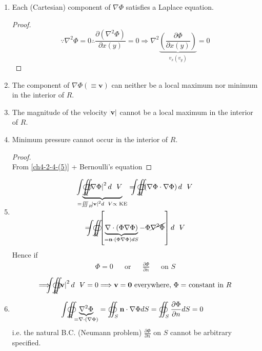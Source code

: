 \begin{enumerate}[label = (\arabic*)]
\begin{proof}
\[\]
\end{proof}
\item Each (Cartesian) component of $\nabla\Phi$ satisfies a Laplace equation.
\begin{proof}
\[
\because\nabla^2\Phi = 0\therefore\frac{\partial\left(\nabla^2\Phi\right)}{\partial x (y)} = 0\Longrightarrow\nabla^2\underbrace{\left(\frac{\partial\Phi}{\partial x(y)}\right)}_{v_x(v_y)} = 0
\]
\end{proof}
\item The component of $\nabla\Phi(\equiv\mathbf{v})$ can neither be a local maximum nor minimum in the interior of $R$.
\item\label{ch4-2-4-(5)} The magnitude of the velocity $\abs{\mathbf{v}}$ cannot be a local maximum in the interior of $R$.
\item Minimum pressure cannot occur in the interior of $R$.
\begin{proof}\mbox{}\\
From \ref{ch4-2-4-(5)} + Bernoulli's equation
\end{proof}
\item 
\begin{multline*}
\underbrace{{\oiint \hspace{-23.5pt} \int}_R\abs{\nabla\Phi}^2d\volume}_{={\iiint}_R\abs{\mathbf{v}}^2d\volume \propto\text{ KE}} = {\oiint \hspace{-23.5pt} \int}_R\left(\nabla\Phi\cdot\nabla\Phi\right)d\volume\\
 = {\oiint \hspace{-23.5pt} \int}_R\left[\underbrace{\nabla\cdot\left(\Phi\nabla\Phi\right) }_{=\mathbf{n}\cdot\left(\Phi\nabla\Phi\right)dS}- \Phi\cancel{\nabla^2\Phi}\right]d\volume
\end{multline*}
Hence if
\begin{align*}
\Phi = 0&&\text{or}&&\frac{\partial\Phi}{\partial n}&&\text{on }S
\end{align*}
\[
\Longrightarrow{\oiint \hspace{-23.5pt} \int}_R\abs{\mathbf{v}}^2d\volume = 0\Longrightarrow\mathbf{v} = \mathbf{0}\text{ everywhere, $\Phi=$ constant in $R$}
\]
\item
\begin{equation}
{\oiint \hspace{-23.5pt} \int}_R\underbrace{\nabla^2\Phi}_{=\nabla\cdot\left(\nabla\Phi\right)} = \oiint_S\mathbf{n}\cdot\nabla\Phi dS = \oiint_S\frac{\partial\Phi}{\partial n} dS = 0
\end{equation}
i.e. the natural B.C. (Neumann problem) $\displaystyle\frac{\partial\Phi}{\partial n}$ on $S$ cannot be arbitrary specified.

\end{enumerate}
